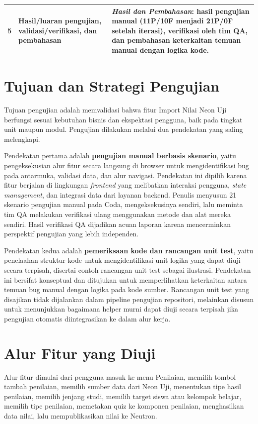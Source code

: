 \begin{table}[htbp]
\begin{tabularx}{\textwidth}{|c|>{\raggedright\arraybackslash}p{5cm}|>{\raggedright\arraybackslash}X|}
		\hline
		5           & Hasil/luaran pengujian, validasi/verifikasi, dan pembahasan & \emph{Hasil dan Pembahasan}: hasil pengujian manual (11P/10F menjadi 21P/0F setelah iterasi), verifikasi oleh tim QA, dan pembahasan keterkaitan temuan manual dengan logika kode.                                                                                                                                                                                          \\
		\hline
	\end{tabularx}
\end{table}

\section{Tujuan dan Strategi Pengujian}
Tujuan pengujian adalah memvalidasi bahwa fitur Import Nilai Neon Uji berfungsi sesuai kebutuhan bisnis dan ekspektasi pengguna, baik pada tingkat unit maupun modul. Pengujian dilakukan melalui dua pendekatan yang saling melengkapi.

Pendekatan pertama adalah \textbf{pengujian manual berbasis skenario}, yaitu pengeksekusian alur fitur secara langsung di browser untuk mengidentifikasi bug pada antarmuka, validasi data, dan alur navigasi. Pendekatan ini dipilih karena fitur berjalan di lingkungan \textit{frontend} yang melibatkan interaksi pengguna, \textit{state management}, dan integrasi data dari layanan backend. Penulis menyusun 21 skenario pengujian manual pada Coda, mengeksekusinya sendiri, lalu meminta tim QA melakukan verifikasi ulang menggunakan metode dan alat mereka sendiri. Hasil verifikasi QA dijadikan acuan laporan karena mencerminkan perspektif pengujian yang lebih independen.

Pendekatan kedua adalah \textbf{pemeriksaan kode dan rancangan unit test}, yaitu penelaahan struktur kode untuk mengidentifikasi unit logika yang dapat diuji secara terpisah, disertai contoh rancangan unit test sebagai ilustrasi. Pendekatan ini bersifat konseptual dan ditujukan untuk memperlihatkan keterkaitan antara temuan bug manual dengan logika pada kode sumber. Rancangan unit test yang disajikan tidak dijalankan dalam pipeline pengujian repositori, melainkan disusun untuk menunjukkan bagaimana helper murni dapat diuji secara terpisah jika pengujian otomatis diintegrasikan ke dalam alur kerja.

\section{Alur Fitur yang Diuji}
Alur fitur dimulai dari pengguna masuk ke menu Penilaian, memilih tombol tambah penilaian, memilih sumber data dari Neon Uji, menentukan tipe hasil penilaian, memilih jenjang studi, memilih target siswa atau kelompok belajar, memilih tipe penilaian, memetakan quiz ke komponen penilaian, menghasilkan data nilai, lalu mempublikasikan nilai ke Neutron.

